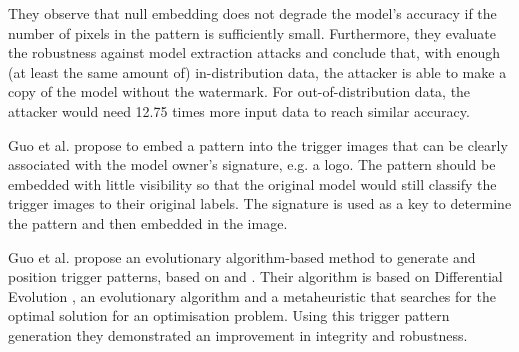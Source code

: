 They observe that null embedding does not degrade the model's accuracy if the number of pixels in the pattern is sufficiently small.
Furthermore, they evaluate the robustness against model extraction attacks and conclude that, with enough (at least the same amount of) in-distribution data, the attacker is able to make a copy of the model without the watermark. For out-of-distribution data, the attacker would need 12.75 times more input data to reach similar accuracy.

Guo et al. \cite{guo_watermarking_2018} propose to embed a pattern into the trigger images that can be clearly associated with the model owner's signature, e.g. a logo. The pattern should be embedded with little visibility so that the original model would still classify the trigger images to their original labels. The signature is used as a key to determine the pattern and then embedded in the image.%

Guo et al. \cite{guo_evolutionary_2019} propose an evolutionary algorithm-based method to generate and position trigger patterns, based on \cite{zhang_protecting_2018} and \cite{guo_watermarking_2018}. %
Their algorithm is based on Differential Evolution \cite{storn_differential_1997}, %
an evolutionary algorithm and a metaheuristic that searches for the optimal solution for an optimisation problem.
Using this trigger pattern generation they demonstrated an improvement in integrity and robustness.

